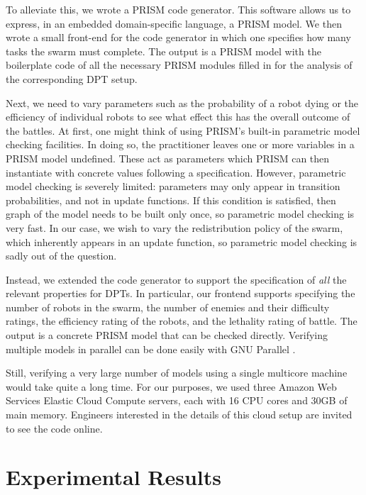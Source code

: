 \documentclass[11pt]{article}
\theoremstyle{definition}
\begin{document}
To alleviate this, we wrote a PRISM code generator.
This software allows us to express, in an embedded domain-specific language, a
PRISM model.
We then wrote a small front-end for the code generator in which one specifies
how many tasks the swarm must complete.
The output is a PRISM model with the boilerplate code of all the necessary
PRISM modules filled in for the analysis of the corresponding DPT setup.

Next, we need to vary parameters such as the probability of a robot dying or
the efficiency of individual robots to see what effect this has the overall
outcome of the battles.
%
At first, one might think of using PRISM's built-in parametric model checking
facilities.
%
In doing so, the practitioner leaves one or more variables in a PRISM model
undefined.
%
These act as parameters which PRISM can then instantiate with concrete values
following a specification.
%
However, parametric model checking is severely limited:
parameters may only appear in transition probabilities, and not in update
functions.
%
If this condition is satisfied, then graph of the model needs to be built only
once, so parametric model checking is very fast.
%
In our case, we wish to vary the redistribution policy of the swarm, which
inherently appears in an update function, so parametric model checking is sadly
out of the question.

Instead, we extended the code generator to support the specification of
\emph{all} the relevant properties for DPTs.
%
In particular, our frontend supports specifying the number of robots in the
swarm, the number of enemies and their difficulty ratings, the efficiency
rating of the robots, and the lethality rating of battle.
%
The output is a concrete PRISM model that can be checked directly.
%
Verifying multiple models in parallel can be done easily with GNU Parallel
\cite{parallel}.

Still, verifying a very large number of models using a single multicore machine
would take quite a long time.
For our purposes, we used three Amazon Web Services Elastic Cloud Compute
servers, each with 16 CPU cores and 30GB of main memory.
Engineers interested in the details of this cloud setup are invited to see the
code online\footnotemark.


\section{Experimental Results}
\label{sec:results}
\end{document}
